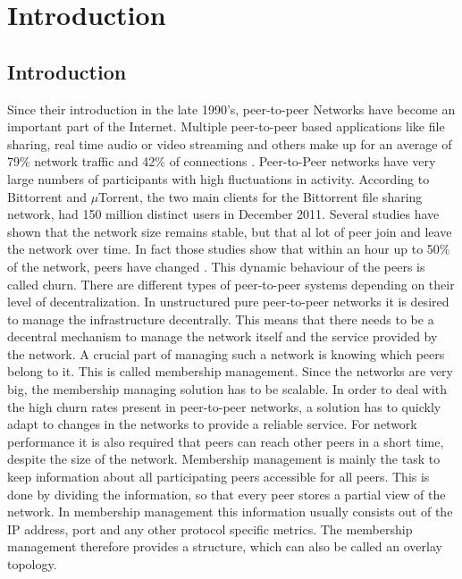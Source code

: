 \chapter{Introduction} 
\label{chap:introduction}

\section{Introduction}
Since their introduction in the late 1990's, peer-to-peer Networks have become
an important part of the Internet. Multiple peer-to-peer based applications like
file sharing, real time audio or video streaming and others make up for an average of
79\% network traffic and 42\% of connections \cite{John+:InetTraffic}.
Peer-to-Peer networks have very large numbers of participants with high
fluctuations in activity. According to \cite{bittorrent} Bittorrent and
$\mu$Torrent, the two main clients for the Bittorrent file sharing network, had
150 million distinct users in December 2011. Several studies have shown that the network size remains stable,
but that al lot of peer join and leave the network over time. In fact those
studies show that within an hour up to 50\% of the network, peers have
changed\cite{stutzbach2006understanding} \cite{falkner2007profiling}. This
dynamic behaviour of the peers is called churn. There are different types of
peer-to-peer systems depending on their level of decentralization. In
unstructured pure peer-to-peer networks it is desired to manage the
infrastructure decentrally. This means that there needs to be a
decentral mechanism to manage the network itself and the service provided by
the network. A crucial part of managing such a network is knowing which peers belong
to it. This is called membership management. Since the networks are very big,
the membership managing solution has to be scalable. In order to deal with the high
churn rates present in peer-to-peer networks, a solution has to quickly adapt to
changes in the networks to provide a reliable service. For network performance
it is also required that peers can reach other peers in a short time, despite
the size of the network. Membership management is mainly the task to keep
information about all participating peers accessible for all peers. This is
done by dividing the information, so that every peer stores a partial view of
the network. In membership management this information usually consists out of
the IP address, port and any other protocol specific metrics. The membership
management therefore provides a structure, which can also be called an overlay
topology.

